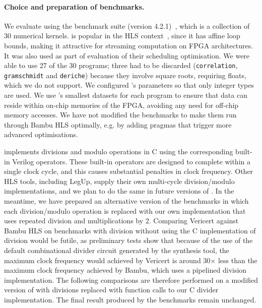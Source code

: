 \paragraph{Choice and preparation of benchmarks.} We evaluate \vericert{} using
the \polybench{} benchmark suite (version 4.2.1)~\cite{pouchet20_polyb_c}, which
is a collection of 30 numerical kernels. \polybench{} is popular in the HLS
context~\cite{choi18_hbods,pouchet13_polyh,zhao17_comba,zuo13_improv}, since it
has affine loop bounds, making it attractive for streaming computation on FPGA
architectures.  It was also used as part of
\textcite{six22_formal_verif_super_sched} evaluation of their scheduling
optimisation.  We were able to use 27 of the 30 programs; three had to be
discarded (\texttt{cor\-re\-la\-tion}, \texttt{gram\-schmi\-dt} and
\texttt{de\-riche}) because they involve square roots, requiring floats, which
we do not support.  We configured \polybench{}'s parameters so that only integer
types are used.  We use \polybench{}'s smallest datasets for each program to
ensure that data can reside within on-chip memories of the FPGA, avoiding any
need for off-chip memory accesses. We have not modified the benchmarks to make
them run through Bambu HLS optimally, e.g. by adding pragmas that trigger more
advanced optimisations.

\vericert{} implements divisions and modulo operations in C using the
corresponding built-in Verilog operators. These built-in operators are designed
to complete within a single clock cycle, and this causes substantial penalties
in clock frequency.  Other HLS tools, including LegUp, supply their own
multi-cycle division/modulo implementations, and we plan to do the same in
future versions of \vericert{}.  In the meantime, we have prepared an
alternative version of the benchmarks in which each division/modulo operation is
replaced with our own implementation that uses repeated division and
multiplications by 2.  Comparing Vericert against Bambu HLS on benchmarks with
division without using the C implementation of division would be futile, as
preliminary tests show that because of the use of the default combinational
divider circuit generated by the synthesis tool, the maximum clock frequency
would achieved by Vericert is around 30$\times$ less than the maximum clock
frequency achieved by Bambu, which uses a pipelined division implementation.
The following comparisons are therefore performed on a modified version of
\polybench{} with divisions replaced with function calls to our C divider
implementation.  The final result produced by the benchmarks remain unchanged.


